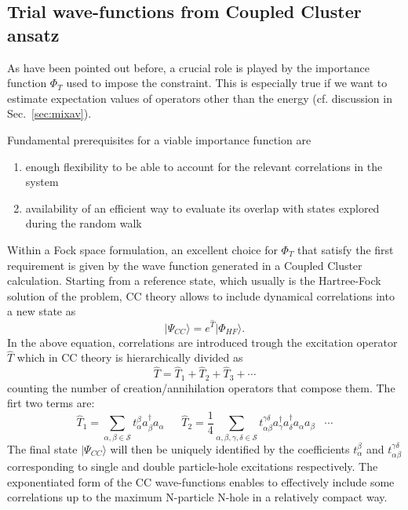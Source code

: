 
\subsection{Trial wave-functions from Coupled Cluster ansatz}
As have been pointed out before, a crucial role is played by the
importance function $\Phi_T$ used to impose the constraint. This is especially true if we want
to estimate expectation values of operators other than the energy (cf. discussion in Sec.~\ref{sec:mixav}).

Fundamental prerequisites for a viable importance function are
\begin{enumerate}
 \item enough flexibility to be able to account for the relevant correlations in the system
 \item availability of an efficient way to evaluate its overlap with states explored during the random walk
\end{enumerate}

Within a Fock space formulation, an excellent choice for $\Phi_T$ that satisfy the first requirement is given by the wave 
function generated in a Coupled Cluster calculation. Starting from a reference state,
which usually is the Hartree-Fock solution of the problem, CC theory allows to
include dynamical correlations into a new state as
\begin{equation}
\label{eq:ccwf}
\vert \Psi_{CC}\rangle = e^{\hat{T}}\vert \Phi_{HF} \rangle.
\end{equation}
In the above equation, correlations are introduced trough the excitation operator $\hat{T}$ which
in CC theory is hierarchically divided as 
\begin{equation}
\hat{T}=\hat{T}_1+\hat{T}_2 + \hat{T}_3+\cdots 
\end{equation}
counting the number of creation/annihilation operators that compose them. The firt two terms are:
\begin{equation}
\hat{T}_1=\sum_{\alpha,\beta \in \mathcal{S}} t_\alpha^\beta a^{\dagger}_\beta a_\alpha
 \;\quad\; \hat{T}_2=\frac{1}{4}\sum_{\alpha,\beta,\gamma,\delta \in \mathcal{S}} t_{\alpha\beta}^{\gamma\delta} a^{\dagger}_\gamma a^{\dagger}_\delta a_\alpha a_\beta \;\;\; \cdots
\end{equation}
The final state $\vert \Psi_{CC}\rangle$ will then be uniquely identified by the coefficients $t_\alpha^\beta$ and $t_{\alpha\beta}^{\gamma\delta}$ corresponding
to single and double particle-hole excitations respectively. The exponentiated form of the CC wave-functions enables to effectively include
some correlations up to the maximum N-particle N-hole in a relatively compact way.

